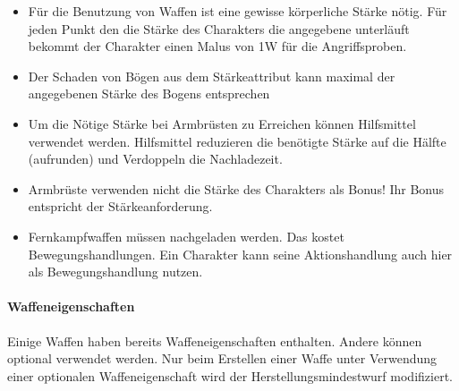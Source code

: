 \documentclass{article}
\begin{document}
\begin{itemize}
\item Für die Benutzung von Waffen ist eine gewisse körperliche Stärke nötig. Für jeden Punkt den die Stärke des Charakters die angegebene unterläuft bekommt der Charakter einen Malus von 1W für die Angriffsproben.
\item Der Schaden von Bögen aus dem Stärkeattribut kann maximal der angegebenen Stärke des Bogens entsprechen
\item Um die Nötige Stärke bei Armbrüsten zu Erreichen können Hilfsmittel verwendet werden. Hilfsmittel reduzieren die benötigte Stärke auf die Hälfte (aufrunden) und Verdoppeln die Nachladezeit.
\item Armbrüste verwenden nicht die Stärke des Charakters als Bonus! Ihr Bonus entspricht der Stärkeanforderung.
\item Fernkampfwaffen müssen nachgeladen werden. Das kostet Bewegungshandlungen. Ein Charakter kann seine Aktionshandlung auch hier als Bewegungshandlung nutzen.
\end{itemize}

\paragraph{Waffeneigenschaften}

Einige Waffen haben bereits Waffeneigenschaften enthalten. Andere können optional verwendet werden. Nur beim
Erstellen einer Waffe unter Verwendung einer optionalen Waffeneigenschaft wird der Herstellungsmindestwurf modifiziert.
\end{document}

